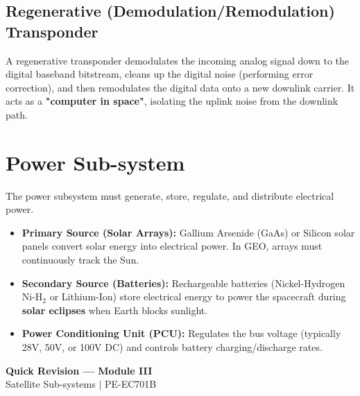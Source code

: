 \documentclass[12pt,a4paper]{article}
\begin{document}
\subsection{Regenerative (Demodulation/Remodulation) Transponder}
A regenerative transponder demodulates the incoming analog signal down to the digital baseband bitstream, cleans up the digital noise (performing error correction), and then remodulates the digital data onto a new downlink carrier.
It acts as a \textbf{"computer in space"}, isolating the uplink noise from the downlink path.

\section{Power Sub-system}

The power subsystem must generate, store, regulate, and distribute electrical power.
\begin{itemize}[leftmargin=*, itemsep=3.5pt]
  \item \textbf{Primary Source (Solar Arrays):} Gallium Arsenide (GaAs) or Silicon solar panels convert solar energy into electrical power. In GEO, arrays must continuously track the Sun.
  \item \textbf{Secondary Source (Batteries):} Rechargeable batteries (Nickel-Hydrogen $\text{Ni-H}_2$ or Lithium-Ion) store electrical energy to power the spacecraft during \textbf{solar eclipses} when Earth blocks sunlight.
  \item \textbf{Power Conditioning Unit (PCU):} Regulates the bus voltage (typically 28V, 50V, or 100V DC) and controls battery charging/discharge rates.
\end{itemize}

\newpage
\begin{center}
  {\large\bfseries\color{myred} Quick Revision --- Module III}\\[3pt]
  {\small\color{mydark} Satellite Sub-systems $|$ PE-EC701B}
\end{center}
\noindent{\color{myred}\rule{\linewidth}{1.2pt}}
\vspace{4pt}
\end{document}
